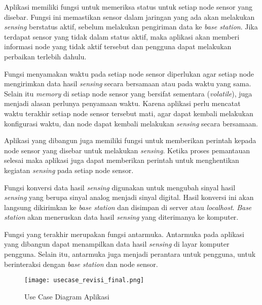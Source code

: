 Aplikasi memiliki fungsi untuk memeriksa status untuk setiap node sensor yang disebar. Fungsi ini memastikan sensor dalam jaringan yang ada akan melakukan \textit{sensing} berstatus aktif, sebelum melakukan pengiriman data ke \textit{base station}. Jika terdapat sensor yang tidak dalam status aktif, maka aplikasi akan memberi informasi node yang tidak aktif tersebut dan pengguna dapat melakukan perbaikan terlebih dahulu.

Fungsi menyamakan waktu pada setiap node sensor diperlukan agar setiap node mengirimkan data hasil \textit{sensing} secara bersamaan atau pada waktu yang sama. Selain itu \textit{memory} di setiap node sensor yang bersifat sementara (\textit{volatile}), juga menjadi alasan perlunya penyamaan waktu. Karena aplikasi perlu mencatat waktu terakhir setiap node sensor tersebut mati, agar dapat kembali melakukan konfigurasi waktu, dan node dapat kembali melakukan \textit{sensing} secara bersamaan.

Aplikasi yang dibangun juga memiliki fungsi untuk memberikan perintah kepada node sensor yang disebar untuk melakukan \textit{sensing}. Ketika proses pemantauan selesai maka aplikasi juga dapat memberikan perintah untuk menghentikan kegiatan \textit{sensing} pada setiap node sensor.

Fungsi konversi data hasil \textit{sensing} digunakan untuk mengubah sinyal hasil \textit{sensing} yang berupa sinyal analog menjadi sinyal digital. Hasil konversi ini akan langsung dikirimkan ke \textit{base station} dan disimpan di server atau \textit{localhost}. \textit{Base station} akan meneruskan data hasil \textit{sensing} yang diterimanya ke komputer.

Fungsi yang terakhir merupakan fungsi antarmuka. Antarmuka pada aplikasi yang dibangun dapat menampilkan data hasil \textit{sensing} di layar komputer pengguna. Selain itu, antarmuka juga menjadi perantara untuk pengguna, untuk berinteraksi dengan \textit{base station} dan node sensor. 

    \begin{figure}[H]
    	\centering  
    	\texttt{[image: usecase\_revisi\_final.png]}  
    	\caption[Use Case Diagram Aplikasi]{Use Case Diagram Aplikasi} 
    	\label{fig:Use Case Diagram Aplikasi} 
    \end{figure} 
    

